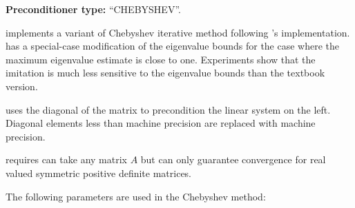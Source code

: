 \textbf{Preconditioner type:} ``CHEBYSHEV''.


\ifpacktwo{} implements a variant of Chebyshev iterative method following
\ifpack{}'s implementation.  \ifpack{} has a special-case modification of the
eigenvalue bounds for the case where the maximum eigenvalue estimate is close to
one. Experiments show that the \ifpack{} imitation is much less sensitive to the
eigenvalue bounds than the textbook version.

\ifpacktwo{} uses the diagonal of the matrix to precondition the linear system on the
left. Diagonal elements less than machine precision are replaced with machine
precision.

\ifpacktwo{} requires can take any matrix $A$ but can only guarantee convergence
for real valued symmetric positive definite matrices.

The following parameters are used in the Chebyshev method:

